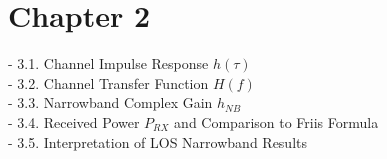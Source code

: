 \chapter{Chapter 2}
- 3.1. Channel Impulse Response $h(\tau)$\\
- 3.2. Channel Transfer Function $H(f)$\\
- 3.3. Narrowband Complex Gain $h_{NB}$\\
- 3.4. Received Power $P_{RX}$ and Comparison to Friis Formula\\
- 3.5. Interpretation of LOS Narrowband Results\\